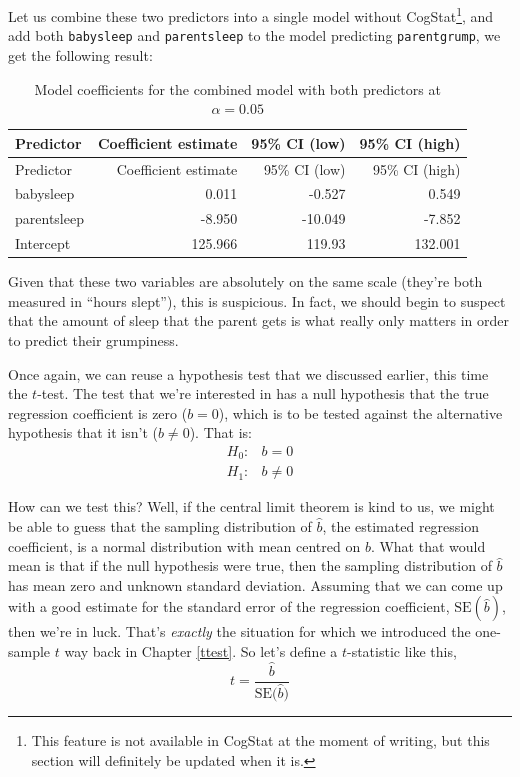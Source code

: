 \documentclass[
]{book}
\theoremstyle{definition}
\theoremstyle{definition}
\theoremstyle{definition}
\theoremstyle{definition}
\theoremstyle{remark}
\begin{document}
Let us combine these two predictors into a single model without CogStat\footnote{This feature is not available in CogStat at the moment of writing, but this section will definitely be updated when it is.}, and add both \texttt{babysleep} and \texttt{parentsleep} to the model predicting \texttt{parentgrump}, we get the following result:

\begin{longtable}[]{@{}lrrr@{}}
\caption{\label{tab:unnamed-chunk-106}Model coefficients for the combined model with both predictors at \(\alpha = 0.05\)}\tabularnewline
\toprule()
Predictor & Coefficient estimate & 95\% CI (low) & 95\% CI (high) \\
\midrule()
\endfirsthead
\toprule()
Predictor & Coefficient estimate & 95\% CI (low) & 95\% CI (high) \\
\midrule()
\endhead
babysleep & 0.011 & -0.527 & 0.549 \\
parentsleep & -8.950 & -10.049 & -7.852 \\
Intercept & 125.966 & 119.93 & 132.001 \\
\bottomrule()
\end{longtable}

Given that these two variables are absolutely on the same scale (they're both measured in ``hours slept''), this is suspicious. In fact, we should begin to suspect that the amount of sleep that the parent gets is what really only matters in order to predict their grumpiness.

Once again, we can reuse a hypothesis test that we discussed earlier, this time the \(t\)-test. The test that we're interested in has a null hypothesis that the true regression coefficient is zero (\(b = 0\)), which is to be tested against the alternative hypothesis that it isn't (\(b \neq 0\)). That is:
\[
\begin{array}{rl}
H_0: & b = 0 \\
H_1: & b \neq 0 
\end{array}
\]

How can we test this? Well, if the central limit theorem is kind to us, we might be able to guess that the sampling distribution of \(\hat{b}\), the estimated regression coefficient, is a normal distribution with mean centred on \(b\). What that would mean is that if the null hypothesis were true, then the sampling distribution of \(\hat{b}\) has mean zero and unknown standard deviation. Assuming that we can come up with a good estimate for the standard error of the regression coefficient, \(\mbox{SE}({\hat{b}})\), then we're in luck. That's \emph{exactly} the situation for which we introduced the one-sample \(t\) way back in Chapter \ref{ttest}. So let's define a \(t\)-statistic like this,
\[
t = \frac{\hat{b}}{\mbox{SE}({\hat{b})}}
\]
\end{document}
